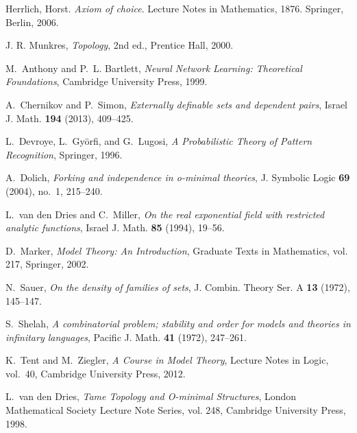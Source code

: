 \begin{thebibliography}{999}
    Herrlich, Horst.
    \textit{Axiom of choice}.
    Lecture Notes in Mathematics, 1876.
    Springer, Berlin, 2006.



    J. R. Munkres, \textit{Topology}, 2nd ed., Prentice Hall, 2000.


    M.~Anthony and P.~L. Bartlett, \emph{Neural Network Learning: Theoretical
    Foundations}, Cambridge University Press, 1999.

    A.~Chernikov and P.~Simon, \emph{Externally definable sets and dependent
    pairs}, Israel J. Math. \textbf{194} (2013), 409--425.

    L.~Devroye, L.~Györfi, and G.~Lugosi, \emph{A Probabilistic Theory of Pattern
    Recognition}, Springer, 1996.

    A.~Dolich, \emph{Forking and independence in o-minimal theories}, J. Symbolic
    Logic \textbf{69} (2004), no.~1, 215--240.

    L.~van den Dries and C.~Miller, \emph{On the real exponential field with
    restricted analytic functions}, Israel J. Math. \textbf{85} (1994), 19--56.

    D.~Marker, \emph{Model Theory: An Introduction}, Graduate Texts in Mathematics,
    vol. 217, Springer, 2002.

    N.~Sauer, \emph{On the density of families of sets}, J. Combin. Theory Ser. A
    \textbf{13} (1972), 145--147.

    S.~Shelah, \emph{A combinatorial problem; stability and order for models and
    theories in infinitary languages}, Pacific J. Math. \textbf{41} (1972),
    247--261.

    K.~Tent and M.~Ziegler, \emph{A Course in Model Theory}, Lecture Notes in
    Logic, vol.~40, Cambridge University Press, 2012.

    L.~van den Dries, \emph{Tame Topology and O-minimal Structures}, London
    Mathematical Society Lecture Note Series, vol. 248, Cambridge University
    Press, 1998.



\end{thebibliography}